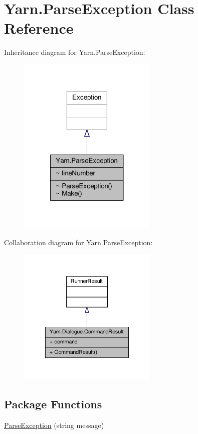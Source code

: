 \hypertarget{a00135}{\section{Yarn.\-Parse\-Exception Class Reference}
\label{a00135}
}


Inheritance diagram for Yarn.\-Parse\-Exception\-:
\nopagebreak
\begin{figure}[H]
\begin{center}
\leavevmode
\includegraphics[width=188pt]{a00622}
\end{center}
\end{figure}


Collaboration diagram for Yarn.\-Parse\-Exception\-:
\nopagebreak
\begin{figure}[H]
\begin{center}
\leavevmode
\includegraphics[width=188pt]{a00623}
\end{center}
\end{figure}
\subsection*{Package Functions}
\begin{DoxyCompactItemize}
\item 
\hyperlink{a00135_aa3c4f5c8b0ae86097bbc46044df9f317}{Parse\-Exception} (string message)
\end{DoxyCompactItemize}
